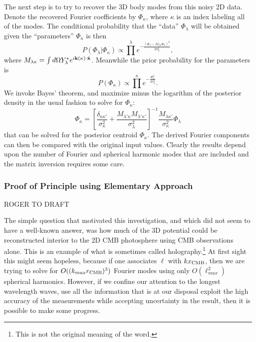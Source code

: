 \documentclass[psfig,11pt]{article}
\begin{document}
The next step is to try to recover the 3D body modes from this noisy 2D data. Denote the recovered Fourier coefficients by $\Phi_\kappa$, where $\kappa$ is an index labeling all of the modes. The conditional probability that the ``data'' $\Phi_\lambda$ will be obtained given the ``parameters'' $\Phi_\kappa$ is then
\begin{equation}
P(\Phi_\lambda|\Phi_\kappa)\propto\prod^\lambda e^{-\frac{(\Phi_\lambda-M_{\lambda\kappa}\Phi_\kappa)^2}{2\sigma_Y^2}},
\end{equation}
where $M_{\lambda\kappa}=\int d\Omega Y^\ast_\lambda e^{i{\bf k}(\kappa)\cdot{\hat{\bf x}}}$. Meanwhile the prior probability for the parameters is
\begin{equation}
P(\Phi_\kappa)\propto\prod^\kappa e^{-\frac{\Phi_\kappa^2}{2\sigma_k^2}}.
\end{equation}
We invoke Bayes' theorem, and maximize minus  the logarithm of the posterior density in the usual fashion to solve for $\Phi_\kappa$:
\begin{equation}
\Phi_\kappa= \left[\frac{\delta_{\kappa\kappa'}}{\sigma_\kappa^2}+\frac{M_{\lambda'\kappa}M_{\lambda'\kappa'}}{\sigma_\lambda^2}\right]^{-1}\frac{M_{\lambda\kappa'}}{\sigma_\kappa^2}\Phi_\lambda
\end{equation}
that can be solved for the posterior centroid $\Phi_\kappa$. The derived Fourier components can then be compared with the original input values. Clearly the results depend upon the number of Fourier and spherical harmonic modes that are included and the matrix inversion requires some care.

\subsubsection{Proof of Principle using Elementary Approach}

ROGER TO DRAFT

The simple question that motivated this investigation, and which did not seem to have a well-known answer, was how much of the 3D potential could be reconstructed interior to the 2D CMB photosphere using CMB observations alone. This is an example of what is sometimes called holography.\footnote{This is not the original meaning of the word.}  At first sight this might seem hopeless, because if one associates $\ell$ with $kx_{\rm CMB}$, then we are trying to solve for $O((k_{max}r_{\rm CMB})^3)$ Fourier modes using only $O(\ell_{max}^2)$ spherical harmonics. However, if we confine our attention to the longest wavelength waves, use all the information that is at our disposal exploit the high accuracy of the measurements while accepting uncertainty in the result, then it is possible to make some progress.
\end{document}
